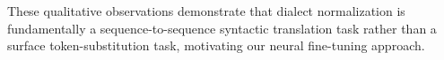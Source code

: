 \documentclass[11pt, a4paper]{article}
\begin{document}
These qualitative observations demonstrate that dialect normalization is fundamentally a sequence-to-sequence syntactic translation task rather than a surface token-substitution task, motivating our neural fine-tuning approach.

\end{document}

